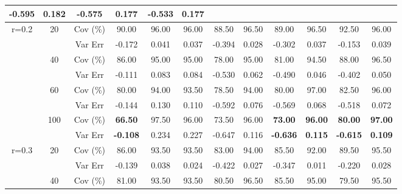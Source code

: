 \begin{table}[!h]
{\begin{tabular}{|c|c|c|c|cccccccc|}
-0.595 &
\multicolumn{1}{c|}{0.182} &
\textbf{-0.575} &
\multicolumn{1}{c|}{\textbf{0.177}} &
\textbf{-0.533} &
\textbf{0.177} \\ \hline
\multirow{8}{*}{r=0.2} &
\multirow{2}{*}{20} &
Cov (\%) &
90.00 &
96.00 &
\multicolumn{1}{c|}{96.00} &
88.50 &
\multicolumn{1}{c|}{96.50} &
89.00 &
\multicolumn{1}{c|}{96.50} &
92.50 &
96.00 \\
&
&
Var Err &
-0.172 &
0.041 &
\multicolumn{1}{c|}{0.037} &
-0.394 &
\multicolumn{1}{c|}{0.028} &
-0.302 &
\multicolumn{1}{c|}{0.037} &
-0.153 &
0.039 \\ \cline{2-12} 
&
\multirow{2}{*}{40} &
Cov (\%) &
86.00 &
95.00 &
\multicolumn{1}{c|}{95.00} &
78.00 &
\multicolumn{1}{c|}{95.00} &
81.00 &
\multicolumn{1}{c|}{94.50} &
88.00 &
96.50 \\
&
&
Var Err &
-0.111 &
0.083 &
\multicolumn{1}{c|}{0.084} &
-0.530 &
\multicolumn{1}{c|}{0.062} &
-0.490 &
\multicolumn{1}{c|}{0.046} &
-0.402 &
0.050 \\ \cline{2-12} 
&
\multirow{2}{*}{60} &
Cov (\%) &
80.00 &
94.00 &
\multicolumn{1}{c|}{93.50} &
78.50 &
\multicolumn{1}{c|}{94.00} &
80.00 &
\multicolumn{1}{c|}{97.00} &
82.50 &
96.00 \\
&
&
Var Err &
-0.144 &
0.130 &
\multicolumn{1}{c|}{0.110} &
-0.592 &
\multicolumn{1}{c|}{0.076} &
-0.569 &
\multicolumn{1}{c|}{0.068} &
-0.518 &
0.072 \\ \cline{2-12} 
&
\multirow{2}{*}{100} &
Cov (\%) &
\textbf{66.50} &
97.50 &
\multicolumn{1}{c|}{96.00} &
73.50 &
\multicolumn{1}{c|}{96.00} &
\textbf{73.00} &
\multicolumn{1}{c|}{\textbf{96.00}} &
\textbf{80.00} &
\textbf{97.00} \\
&
&
Var Err &
\textbf{-0.108} &
0.234 &
\multicolumn{1}{c|}{0.227} &
-0.647 &
\multicolumn{1}{c|}{0.116} &
\textbf{-0.636} &
\multicolumn{1}{c|}{\textbf{0.115}} &
\textbf{-0.615} &
\textbf{0.109} \\ \hline
\multirow{8}{*}{r=0.3} &
\multirow{2}{*}{20} &
Cov (\%) &
86.00 &
93.50 &
\multicolumn{1}{c|}{93.50} &
83.00 &
\multicolumn{1}{c|}{94.00} &
85.50 &
\multicolumn{1}{c|}{92.00} &
89.50 &
95.50 \\
&
&
Var Err &
-0.139 &
0.038 &
\multicolumn{1}{c|}{0.024} &
-0.422 &
\multicolumn{1}{c|}{0.027} &
-0.347 &
\multicolumn{1}{c|}{0.011} &
-0.220 &
0.028 \\ \cline{2-12} 
&
\multirow{2}{*}{40} &
Cov (\%) &
81.00 &
93.50 &
\multicolumn{1}{c|}{93.50} &
80.50 &
\multicolumn{1}{c|}{96.50} &
85.50 &
\multicolumn{1}{c|}{95.00} &
79.50 &
95.50 \\

\end{tabular}}
\end{table}
